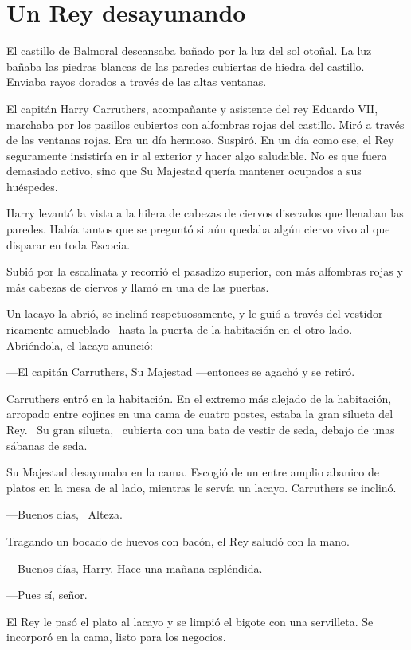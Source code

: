 \chapter*{Un Rey desayunando}

El castillo de Balmoral descansaba bañado por la luz del sol otoñal. La
luz bañaba las piedras blancas de las paredes cubiertas de hiedra del
castillo. Enviaba rayos dorados a través de las altas ventanas.

El capitán Harry Carruthers, acompañante y asistente del rey Eduardo
VII, marchaba por los pasillos cubiertos con alfombras rojas del
castillo. Miró a través de las ventanas rojas. Era un día hermoso.
Suspiró. En un día como ese, el Rey seguramente insistiría en ir al
exterior y hacer algo saludable. No es que fuera demasiado activo, sino
que Su Majestad quería mantener ocupados a sus huéspedes.

Harry levantó la vista a la hilera de cabezas de ciervos disecados que
llenaban las paredes. Había tantos que se preguntó si aún quedaba algún
ciervo vivo al que disparar en toda Escocia.

Subió por la escalinata y recorrió el pasadizo superior, con más
alfombras rojas y más cabezas de ciervos y llamó en una de las puertas.

Un lacayo la abrió, se inclinó respetuosamente, y le guió a través del
vestidor ricamente amueblado ~hasta la puerta de la habitación en el
otro lado. Abriéndola, el lacayo anunció:

---El capitán Carruthers, Su Majestad ---entonces se agachó y se retiró.

Carruthers entró en la habitación. En el extremo más alejado de la
habitación, arropado entre cojines en una cama de cuatro postes, estaba
la gran silueta del Rey. ~Su gran silueta, ~cubierta con una bata de
vestir de seda, debajo de unas sábanas de seda.

Su Majestad desayunaba en la cama. Escogió de un entre amplio abanico de
platos en la mesa de al lado, mientras le servía un lacayo. Carruthers
se inclinó.

---Buenos días, ~Alteza.

Tragando un bocado de huevos con bacón, el Rey saludó con la mano.

---Buenos días, Harry. Hace una mañana espléndida.

---Pues sí, señor.

El Rey le pasó el plato al lacayo y se limpió el bigote con una
servilleta. Se incorporó en la cama, listo para los negocios.

